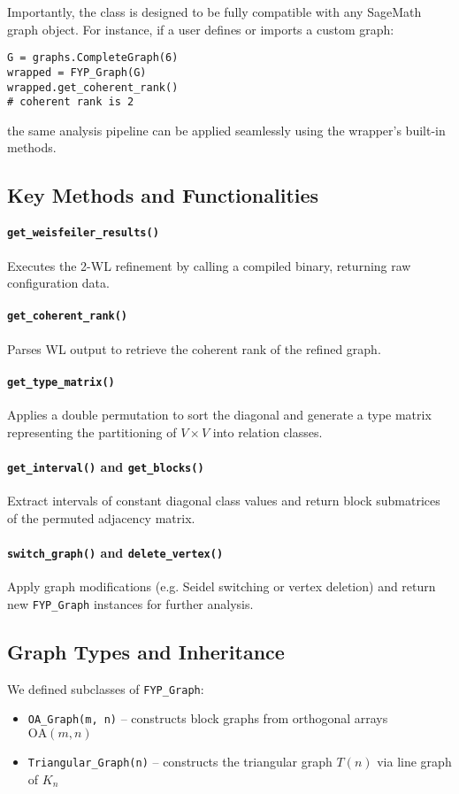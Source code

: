 \noindent
Importantly, the class is designed to be fully compatible with any SageMath graph object. For instance, if a user defines or imports a custom graph:
\begin{verbatim}
G = graphs.CompleteGraph(6)
wrapped = FYP_Graph(G)
wrapped.get_coherent_rank()
# coherent rank is 2
\end{verbatim}
the same analysis pipeline can be applied seamlessly using the wrapper’s built-in methods.

\subsection*{Key Methods and Functionalities}

\paragraph{\texttt{get\_weisfeiler\_results()}}  
Executes the 2-WL refinement by calling a compiled binary, returning raw configuration data.

\paragraph{\texttt{get\_coherent\_rank()}}  
Parses WL output to retrieve the coherent rank of the refined graph.

\paragraph{\texttt{get\_type\_matrix()}}  
Applies a double permutation to sort the diagonal and generate a type matrix representing the partitioning of $V \times V$ into relation classes.

\paragraph{\texttt{get\_interval()} and \texttt{get\_blocks()}}  
Extract intervals of constant diagonal class values and return block submatrices of the permuted adjacency matrix.

\paragraph{\texttt{switch\_graph()} and \texttt{delete\_vertex()}}  
Apply graph modifications (e.g. Seidel switching or vertex deletion) and return new \texttt{FYP\_Graph} instances for further analysis.

\subsection*{Graph Types and Inheritance}
We defined subclasses of \texttt{FYP\_Graph}:
\begin{itemize}
    \item \texttt{OA\_Graph(m, n)} – constructs block graphs from orthogonal arrays $\text{OA}(m,n)$
    \item \texttt{Triangular\_Graph(n)} – constructs the triangular graph $T(n)$ via line graph of $K_n$
\end{itemize}

